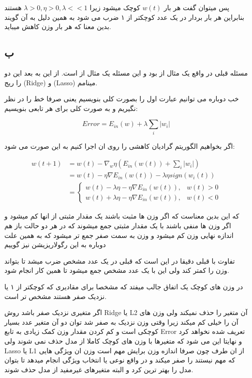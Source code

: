 \documentclass{article}[12pt]
\begin{document}
پس میتوان گفت هر بار 
$w(t)$
کوچک میشود زیرا 
$\lambda > 0,\eta>0, \lambda<<1$
هستند بنابراین 
هر بار بردار در یک عدد کوچکتر از ۱ ضرب می شود به همین دلیل به آن 
گویند
بدین معنا که هر بار وزن کاهش میباید. 
\clearpage
\subsection{ب}

مسئله قبلی در واقع یک مثال از 
بود و این مسئله یک مثال از 
است.
از این به بعد این دو را ریج (Ridge)
و
(Lasso)
مینامم.

خب دوباره می توانیم عبارت اول را بصورت کلی بنویسیم یعنی صرفا خط را در نظر نگیریم و به صورت کلی برای هر تابعی بنویسیم:

\begin{equation}
Error = E_{in}(w) +\lambda \sum_i |w_i|
\end{equation}

اگر بخواهیم الگوریتم گرادیان کاهشی را روی ان اجرا کنیم به این صورت می شود:

\begin{equation}
\begin{split}
w(t+1) &= w(t) -\nabla_w \eta(E_{in}(w(t)) + 
\sum_i |w_i|)
\\
&= w(t) - \eta \nabla E_{in}(w(t)) - \lambda \eta sign(w_i(t))
\\
&= \begin{cases}
w(t) - \lambda \eta - \eta \nabla E_{in}(w(t)), 
& w(t) > 0 \\
w(t) + \lambda \eta - \eta \nabla E_{in}(w(t)), 
& w(t) < 0
\end{cases}
\end{split}
\end{equation}

که این بدین معناست که اگر وزن ها مثبت باشند یک مقدار مثبتی از انها کم میشود و اگر وزن ها منفی باشند با یک مقدار مثبتی جمع میشوند که در هر دو حالت باز هم اندازه نهایی وزن کم میشود و وزن به سمت صفر جمع تر میشود که به همین علت دوباره به این رگولاریزیشن نیز 
گوییم

تفاوت با قبلی دقیقا در این است که قبلی در یک عدد مشخص ضرب میشد تا بتواند وزن را کمتر کند ولی این با یک عدد مشخص جمع میشود تا همین کار انجام شود. 

در وزن های کوچک یک اتفاق جالب میفتد که مشخصا برای مقادیری که کوچکتر از ۱ یا نزدیک صفر هستند مشخص تر است. 
 
اگر متغیری نزدیک صفر باشد روش 
Ridge یا
L2
آن متغیر را حذف نمیکند ولی وزن های آن را خیلی کم میکند  
زیرا وقتی وزن نزدیک به صفر شد توان دو آن متغیر عدد بسیار کوچکی است و کم کردن مقدار وزن
کمک زیادی به تابع Error
تعریف شده نخواهد کرد و نهایتا این می شود که متغیرها با وزن های کوچک کاملا از مدل حذف نمی شوند
ولی 
Lasso
یا 
L1
از ان طرف چون صرفا اندازه وزن برایش مهم است وزن ان ویژگی هایی که مهم نیستند را صفر میکند و در واقع نوعی 
یا انتخاب ویژگی انجام میدهد تا بتوان مدل را بهتر ترین کرد و البته متغیرهای غیرمفید از مدل حذف شوند. 
\end{document}

